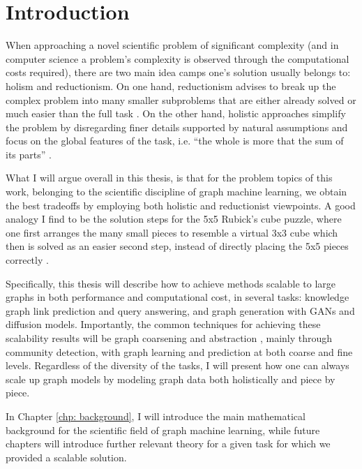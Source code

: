 \chapter{Introduction}
\label{chp: introduction}

When approaching a novel scientific problem of significant complexity (and in computer science a problem's complexity is observed through the computational costs required), there are two main idea camps one's solution usually belongs to: holism and reductionism. On one hand, reductionism advises to break up the complex problem into many smaller subproblems that are either already solved or much easier than the full task \cite{doniger_merriam-websters_1999, kricheldorf_getting_2016}. On the other hand, holistic approaches simplify the problem by disregarding finer details supported by natural assumptions and focus on the global features of the task, i.e. \enquote{the whole is more that the sum of its parts} \cite{marshall_unity_2002, noauthor_what_2022}. 

What I will argue overall in this thesis, is that for the problem topics of this work, belonging to the scientific discipline of graph machine learning, we obtain the best tradeoffs by employing both holistic and reductionist viewpoints. A good analogy I find to be the solution steps for the 5x5 Rubick's cube puzzle, where one first arranges the many small pieces to resemble a virtual 3x3 cube which then is solved as an easier second step, instead of directly placing the 5x5 pieces correctly \cite{guangzhou_ganyuan_intelligent_technology_co_ltd_5x5_nodate}.

Specifically, this thesis will describe how to achieve methods scalable to large graphs in both performance and computational cost, in several tasks: knowledge graph link prediction and query answering, and graph generation with GANs and diffusion models. Importantly, the common techniques for achieving these scalability results will be graph coarsening and abstraction \cite{boneva_graph_2007}, mainly through community detection, with graph learning and prediction at both coarse and fine levels. Regardless of the diversity of the tasks, I will present how one can always scale up graph models by modeling graph data both holistically and piece by piece.

In Chapter \ref{chp: background}, I will introduce the main mathematical background for the scientific field of graph machine learning, while future chapters will introduce further relevant theory for a given task for which we provided a scalable solution. 


